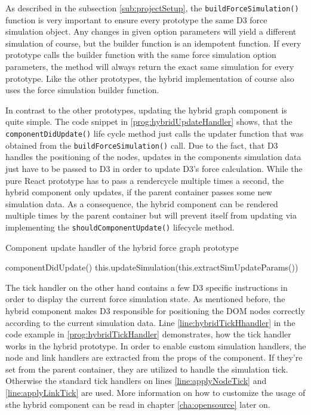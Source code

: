 As described in the subsection \ref{sub:projectSetup}, the \texttt{buildForceSimulation()} function is very important to ensure every prototype the same D3 force simulation object. Any changes in given option parameters will yield a different simulation of course, but the builder function is an idempotent function. If every prototype calls the builder function with the same force simulation option parameters, the method will always return the exact same simulation for every prototype. Like the other prototypes, the hybrid implementation of course also uses the force simulation builder function.

In contrast to the other prototypes, updating the hybrid graph component is quite simple. The code snippet in \ref{prog:hybridUpdateHandler} shows, that the \texttt{componentDidUpdate()} life cycle method just calls the updater function that was obtained from the \texttt{buildForceSimulation()} call. Due to the fact, that D3 handles the positioning of the nodes, updates in the components simulation data just have to be passed to D3 in order to update D3's force calculation. While the pure React prototype has to pass a rendercycle multiple times a second, the hybrid component only updates, if the parent container passes some new simulation data. As a consequence, the hybrid component can be rendered multiple times by the parent container but will prevent itself from updating via implementing the \texttt{shouldComponentUpdate()} lifecycle method.

\begin{program}
\caption{Component update handler of the hybrid force graph prototype}
\label{prog:hybridUpdateHandler}
\begin{JsCode}
componentDidUpdate() {
  this.updateSimulation(this.extractSimUpdateParams())
}
\end{JsCode}
\end{program}

The tick handler on the other hand contains a few D3 specific instructions in order to display the current force simulation state. As mentioned before, the hybrid component makes D3 responsible for positioning the DOM nodes correctly according to the current simulation data. Line \ref{line:hybridTickHhandler} in the code example in \ref{prog:hybridTickHandler} demonstrates, how the tick handler works in the hybrid prototype. In order to enable custom simulation handlers, the node and link handlers are extracted from the props of the component. If they're set from the parent container, they are utilized to handle the simulation tick. Otherwise the standard tick handlers on lines \ref{line:applyNodeTick} and \ref{line:applyLinkTick} are used. More information on how to customize the usage of sthe hybrid component can be read in chapter \ref{cha:opensource} later on.

